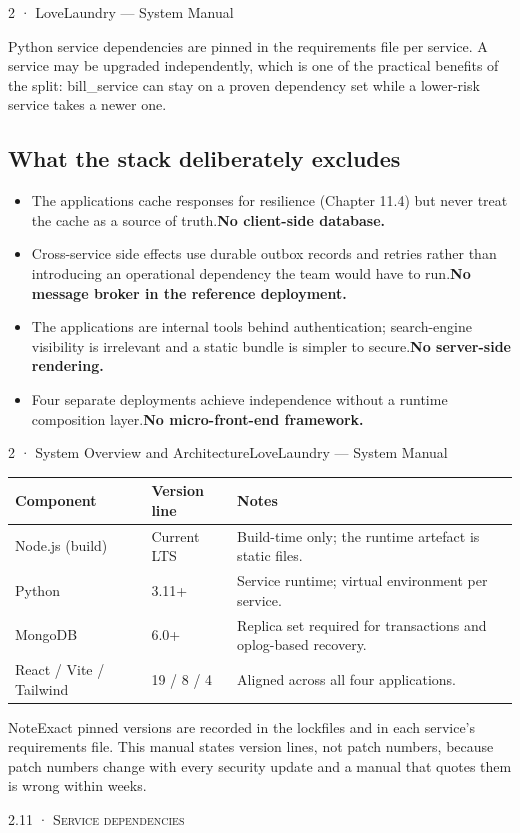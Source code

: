 \documentclass[11pt,a4paper,oneside]{book}
\begin{document}
2 · LoveLaundry — System Manual

Python service dependencies are pinned in the requirements file per service. A service may be upgraded independently, which is one of the practical benefits of the split: bill\_service can stay on a proven dependency set while a lower-risk service takes a newer one.

\subsection*{What the stack deliberately excludes}
\begin{itemize}
\item The applications cache responses for resilience (Chapter 11.4) but never treat the cache as a source of truth.\textbf{No client-side database.}
\item Cross-service side effects use durable outbox records and retries rather than introducing an operational dependency the team would have to run.\textbf{No message broker in the reference deployment.}
\item The applications are internal tools behind authentication; search-engine visibility is irrelevant and a static bundle is simpler to secure.\textbf{No server-side rendering.}
\item Four separate deployments achieve independence without a runtime composition layer.\textbf{No micro-front-end framework.}
\end{itemize}
2 · System Overview and ArchitectureLoveLaundry — System Manual

\begin{center}\small
\begin{tabularx}{\linewidth}{|X|X|X|}
\hline
\rowcolor{lightgrey}
\textbf{Component} & \textbf{Version line} & \textbf{Notes} \\ \hline
Node.js (build) & Current LTS & Build-time only; the runtime artefact is static files. \\ \hline
Python & 3.11+ & Service runtime; virtual environment per service. \\ \hline
MongoDB & 6.0+ & Replica set required for transactions and oplog-based recovery. \\ \hline
React / Vite / Tailwind & 19 / 8 / 4 & Aligned across all four applications. \\ \hline
\end{tabularx}
\end{center}
\begin{notebox}NoteExact pinned versions are recorded in the lockfiles and in each service's requirements file. This manual states version lines, not patch numbers, because patch numbers change with every security update and a manual that quotes them is wrong within weeks.\end{notebox}
\textsc{\small\color{crimson}2.11 · Service dependencies}\par\medskip
\end{document}
